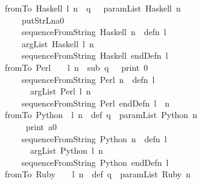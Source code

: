\documentclass[12pt]{article}
\begin{document}
\begin{tabbing}\ttfamily
~~~fromTo~Haskell~l~n~~q~~~paramList~Haskell~n~\\
\ttfamily ~~~~~~~putStrLna0~\\
\ttfamily ~~~~~~~sequenceFromString~Haskell~n~~defn~l~~~\\
\ttfamily ~~~~~~~argList~Haskell~l~n~~~\\
\ttfamily ~~~~~~~sequenceFromString~Haskell~endDefn~l\\
\ttfamily ~~~fromTo~Perl~~~~l~n~~sub~q~~~print~0~\\
\ttfamily ~~~~~~~sequenceFromString~Perl~n~~defn~l~\\
\ttfamily ~~~~~~~~~argList~Perl~l~n~~~\\
\ttfamily ~~~~~~~sequenceFromString~Perl~endDefn~l~~n~~\\
\ttfamily ~~~fromTo~Python~~l~n~~def~q~~paramList~Python~n~\\
\ttfamily ~~~~~~~~print~a0~\\
\ttfamily ~~~~~~~sequenceFromString~Python~n~~defn~l~\\
\ttfamily ~~~~~~~~~argList~Python~l~n~~~\\
\ttfamily ~~~~~~~sequenceFromString~Python~endDefn~l\\
\ttfamily ~~~fromTo~Ruby~~~~l~n~~def~q~~paramList~Ruby~n~\\

\end{tabbing}
\end{document}
